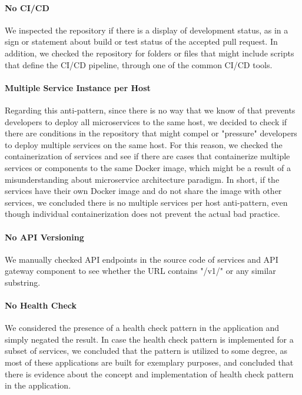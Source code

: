 \documentclass{Configuration_Files/PoliMi3i_thesis}
\begin{document}
\paragraph{No CI/CD} We inspected the repository if there is a display of development status, as in a sign or statement about build or test status of the accepted pull request.
In addition, we checked the repository for folders or files that might include scripts that define the CI/CD pipeline, through one of the common CI/CD tools.

\paragraph{Multiple Service Instance per Host} Regarding this anti-pattern, since there is no way that we know of that prevents developers to deploy all microservices to the same host, we decided to check if there are conditions in the repository that might compel or "pressure" developers to deploy multiple services on the same host.
For this reason, we checked the containerization of services and see if there are cases that containerize multiple services or components to the same Docker image, which might be a result of a misunderstanding about microservice architecture paradigm.
In short, if the services have their own Docker image and do not share the image with other services, we concluded there is no multiple services per host anti-pattern, even though individual containerization does not prevent the actual bad practice.

\paragraph{No API Versioning} We manually checked API endpoints in the source code of services and API gateway component to see whether the URL contains "/v1/" or any similar substring.

\paragraph{No Health Check} We considered the presence of a health check pattern in the application and simply negated the result.
In case the health check pattern is implemented for a subset of services, we concluded that the pattern is utilized to some degree, as most of these applications are built for exemplary purposes, and concluded that there is evidence about the concept and implementation of health check pattern in the application.
\end{document}
